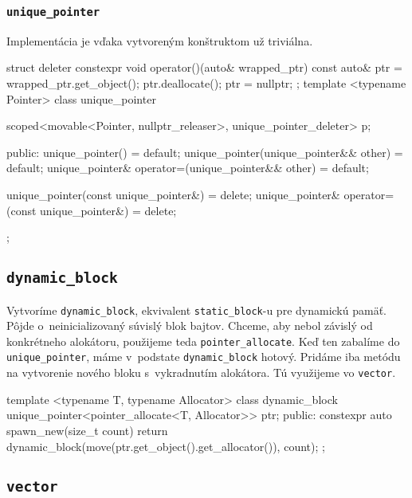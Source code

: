 \subsubsection{\texttt{unique\_pointer}}

Implementácia je vďaka vytvoreným konštruktom už triviálna.
\begin{code}[fontsize=\footnotesize]
struct deleter
{   constexpr void operator()(auto& wrapped_ptr) const
    {   auto& ptr = wrapped_ptr.get_object();
        ptr.deallocate();
        ptr = nullptr; }
};
template <typename Pointer>
class unique_pointer
{   scoped<movable<Pointer, nullptr_releaser>, unique_pointer_deleter> p;

public:
    unique_pointer() = default;
    unique_pointer(unique_pointer&& other) = default;
    unique_pointer& operator=(unique_pointer&& other) = default;
    
    unique_pointer(const unique_pointer&) = delete;
    unique_pointer& operator=(const unique_pointer&) = delete;
};
\end{code}

\subsection{\texttt{dynamic\_block}}

Vytvoríme \texttt{dynamic\_block}, ekvivalent \texttt{static\_block}-u pre dynamickú pamäť. Pôjde o~neinicializovaný súvislý blok bajtov. Chceme, aby nebol závislý od konkrétneho alokátoru, použijeme teda \texttt{pointer\_allocate}. Keď ten zabalíme do \texttt{unique\_pointer}, máme v~podstate \texttt{dynamic\_block} hotový. Pridáme iba metódu na vytvorenie nového bloku s~vykradnutím alokátora. Tú využijeme vo \texttt{vector}.
\begin{code}[fontsize=\footnotesize]
template <typename T, typename Allocator> class dynamic_block
{   unique_pointer<pointer_allocate<T, Allocator>> ptr;
public:
    constexpr auto spawn_new(size_t count)
    { return dynamic_block(move(ptr.get_object().get_allocator()), count); }
};
\end{code}

\subsection{\texttt{vector}}

